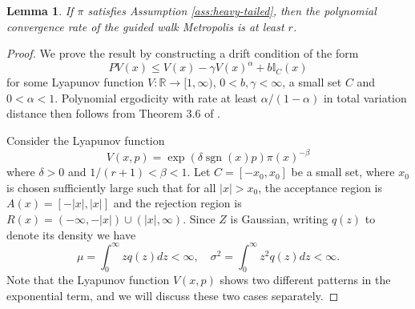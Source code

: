 \documentclass{article}
\theoremstyle{definition}
\theoremstyle{plain}
\newtheorem{lemma}[definition]{Lemma}
\begin{document}

\begin{lemma}
\label{lem:lowerbound_polynomialtails}
    If $\pi$ satisfies Assumption \ref{ass:heavy-tailed}, then the polynomial convergence rate of the guided walk Metropolis is at least $r$.
\end{lemma}

\begin{proof}
We prove the result by constructing a drift condition of the form
\[
PV(x) \leq V(x) - \gamma V(x)^{\alpha} + b\mathbb{I}_C(x)
\]
for some Lyapunov function $V:\mathbb{R} \to [1,\infty)$, $0 < b,\gamma < \infty$, a small set $C$ and $0 < \alpha < 1$.  Polynomial ergodicity with rate at least $\alpha/(1-\alpha)$ in total variation distance then follows from Theorem 3.6 of \citep{jarner2002polynomial}.

Consider the Lyapunov function 
\begin{equation*}
    V(x,p) = \exp(\delta \operatorname{sgn}(x)p) \pi(x)^{-\beta}
\end{equation*}
where $\delta>0$ and $1/
(r+1)<\beta<1$. Let $C = [-x_0,x_0]$ be a small set, where $x_0$ is chosen sufficiently large such that for all $|x|>x_0$, the acceptance region is $A(x) = [-|x|,|x|]$ and the rejection region is $R(x) = (-\infty,-|x|)\cup (|x|,\infty)$. Since $Z$ is Gaussian, writing $q(z)$ to denote its density we have
\begin{equation*}
    \mu = \int_0^\infty z q(z) dz < \infty, \quad \sigma^2 = \int_0^\infty z^2 q(z) dz < \infty.
\end{equation*}
Note that the Lyapunov function $V(x,p)$ shows two different patterns in the exponential term, and we will discuss these two cases separately.


\end{proof}
\end{document}
